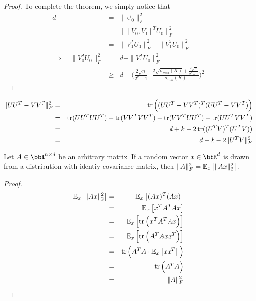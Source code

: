 \begin{proof}
To complete the theorem, we simply notice that:
\begin{eqnarray}
d &=& \|U_0\|_F^2 \\
&=&\|[V_0,V_1]^T U_0\|_F^2 \\
&=& \|V_0^T U_0\|_F^2 + \|V_1^T U_0\|_F^2\\
\Longrightarrow\quad  \|V_0^T U_0\|_F^2 &=& d - \|V_1^T U_0\|_F^2 \\
&\geq& d - \Bigg(\frac{2\sqrt{n}}{2^b-1} \cdot \frac{2\sqrt{\sigma_{max}(K)} + \frac{2\sqrt{n}}{2^b-1} }{\sigma_{min}(K)} \Bigg)^2
\end{eqnarray}
\end{proof}

\begin{lemma}
\label{lemma1}
\begin{eqnarray*}
	\|UU^T - VV^T \|_F^2 &=& \tr\Big( (UU^T - VV^T)^T (UU^T - VV^T)  \Big)\\
	&=& \tr(UU^TUU^T) + \tr(VV^T VV^T) - \tr(VV^T UU^T) - \tr(UU^T VV^T) \\
	&=& d + k - 2 \tr((U^T V)^T (U^T V)) \\
	&=& d + k - 2 \|U^T V\|_F^2
\end{eqnarray*}
\end{lemma}

\begin{lemma}
\label{lemma2}
Let $A \in \RR^{n\times d}$ be an arbitrary matrix. If a random vector $x \in \RR^d$ is drawn from a distribution with identiy covariance matrix, then $\|A\|_F^2 = \expect{x}{\|Ax\|_2^2}$.
\end{lemma}
\begin{proof}
\begin{eqnarray*}
\expect{x}{\|Ax\|_2^2} &=& \expect{x}{(Ax)^T (Ax)} \\
&=& \expect{x}{x^T A^T A x} \\
&=& \expect{x}{\tr \Big(x^T A^T A x\Big)} \\
&=& \expect{x}{\tr \Big(A^T A x x^T\Big)} \\
&=& \tr \Big(A^T A \cdot \expect{x}{x x^T}\Big) \\
&=& \tr \Big(A^T A\Big) \\
&=& \|A\|_F^2 \\
\end{eqnarray*}
\end{proof}


